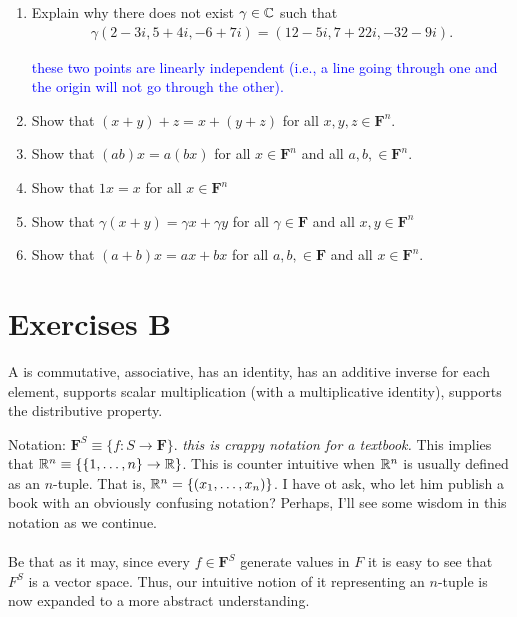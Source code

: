 \documentclass[10pt,a4paper]{report}
\newcommand{\BLUE}[1]{\textcolor{blue}{#1}}
\newcommand{\F}{\textbf{F}}
\begin{document}
\begin{enumerate}
\item Explain why there does not exist $\gamma \in \mathbb{C}$ such that
\begin{align*}
	\gamma(2-3i,5+4i,-6+7i)=(12-5i, 7+22i,-32-9i).
\end{align*}

\BLUE{these two points are linearly independent (i.e., a line going through one and the origin will not go through the other).}

\item Show that $(x+y)+z=x+(y+z)$ for all $x,y,z \in \F^n$.

\item Show that $(ab)x=a(bx)$ for all $x \in \F^n$ and all $a,b,\in \F^n$.

\item Show that $1x =x$ for all $x \in \F^n$

\item Show that $\gamma(x+y)=\gamma x+\gamma y$ for all $\gamma \in \F$ and all $x,y \in \F^n$

\item Show that $(a+b)x=ax+bx$ for all $a,b, \in \F$ and all $x \in \F^n$.


\end{enumerate}

\section{Exercises B}

\begin{definition} A  is commutative, associative, has an identity, has an additive inverse for each element, supports scalar multiplication (with a multiplicative identity), supports the distributive property.
\end{definition}

\begin{remark}Notation:  $\F^S \equiv \{f: S \to \F\}$. \textit{this is crappy notation for a textbook.} This implies that $\mathbb{R}^n \equiv \{ \{1,\dots,n\} \to \mathbb{R}\}$.  This is counter intuitive when $\mathbb{R}^n$ is usually defined as an $n$-tuple.  That is, $\mathbb{R}^n=\{(x_1,\dots, x_n)\}$.  I have ot ask, who let him publish a book with an obviously confusing notation?  Perhaps, I'll see some wisdom in this notation as we continue. \\
\\
Be that as it may, since every $f \in \F^S$ generate values in $F$ it is easy to see that $F^S$ is a vector space.  Thus, our intuitive notion of it representing an $n$-tuple is now expanded to a more abstract understanding.
\end{remark}
\end{document}

